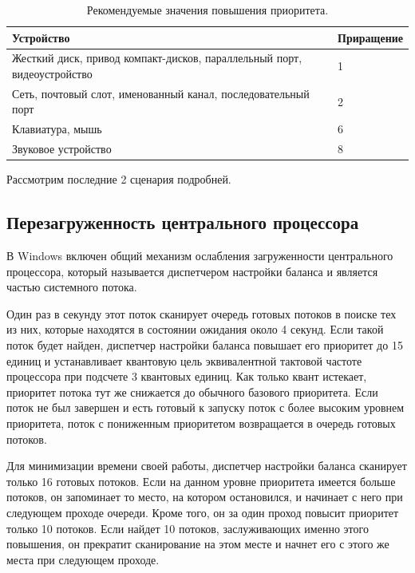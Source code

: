\begin{table}[h!]
	\caption{Рекомендуемые значения повышения приоритета.}
	\begin{center}
		\begin{tabularx}{\textwidth}{|X|X|}
			\hline
			\textbf{Устройство} & \textbf{Приращение} \\
			\hline
			Жесткий диск, привод компакт-дисков, параллельный порт, видеоустройство & 1 \\
			\hline
			Сеть, почтовый слот, именованный канал, последовательный порт & 2 \\
			\hline
			Клавиатура, мышь & 6 \\
			\hline
			Звуковое устройство & 8 \\
			\hline
		\end{tabularx}
	\end{center}
	\label{tab:io}
\end{table}

Рассмотрим последние 2 сценария подробней. 

\subsection{Перезагруженность центрального процессора}

В Windows включен общий механизм ослабления загруженности центрального процессора, который называется диспетчером настройки баланса и является частью системного потока.

Один раз в секунду этот поток сканирует очередь готовых потоков в поиске тех из них, которые находятся в состоянии ожидания около 4 секунд. 
Если такой поток будет найден, диспетчер настройки баланса повышает его приоритет до 15 единиц и устанавливает квантовую цель эквивалентной тактовой частоте процессора при подсчете 3 квантовых единиц. 
Как только квант истекает, приоритет потока тут же снижается до обычного базового приоритета. Если поток не был завершен и есть готовый к запуску поток с более высоким уровнем приоритета, поток с пониженным приоритетом возвращается в очередь готовых потоков.

Для минимизации времени своей работы, диспетчер настройки баланса сканирует только 16 готовых потоков. 
Если на данном уровне приоритета имеется больше потоков, он запоминает то место, на котором остановился, и начинает с него при следующем проходе очереди. 
Кроме того, он за один проход повысит приоритет только 10 потоков. 
Если найдет 10 потоков, заслуживающих именно этого повышения, он прекратит сканирование на этом месте и начнет его с этого же места при следующем проходе.

